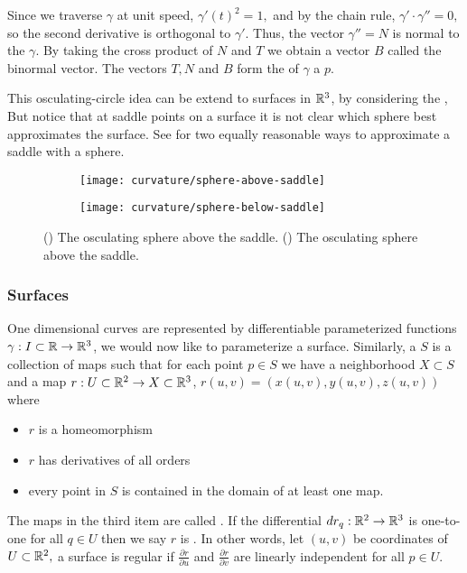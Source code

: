 Since we traverse $\gamma$
at unit speed, $\gamma'(t)^2=1,$ and by the chain rule, $\gamma'\cdot \gamma''=0,$
so  the second derivative is orthogonal to $\gamma'$. Thus, the
vector $\gamma''=N$ is normal to the $\gamma$. 
By taking the cross product of $N$ and $T$ we obtain a vector $B$ called
the binormal vector.
The vectors $T,N$ and $B$ form the  of $\gamma$ a $p.$

 This osculating-circle idea can be extend
to  surfaces in $\mathbb{R}^3$, by considering the ,
But notice that at saddle points on a surface it is not clear which sphere
best approximates the surface. See  for two
equally reasonable ways to approximate a saddle with a sphere.

\begin{figure}[htb]
    \captionsetup[subfigure]{justification=centering}
    \centering
    \begin{subfigure}[b]{0.25\textwidth}
        \texttt{[image: curvature/sphere-above-saddle]}
       \subcaption{}\label{fig:sphere-above-saddle}
    \end{subfigure}
        \hspace{1cm}
        \begin{subfigure}[b]{0.25\textwidth}
        \texttt{[image: curvature/sphere-below-saddle]}
        \subcaption{}\label{fig:sphere-below-saddle}
        \end{subfigure}
    \caption{() The osculating sphere above the saddle.
        () The osculating sphere above the saddle.
    }
    \label{fig:osculating-sphere}
\end{figure}



\subsubsection{Surfaces}


One dimensional curves are represented by differentiable 
parameterized functions $\gamma:I\subset \mathbb{R}\to \mathbb{R}^3$,
we would now like to parameterize a surface.
Similarly, a  $S$ is a collection of maps such that
 for each point $p\in S$ we have a neighborhood $X\subset S$
 and a map $r:U\subset \mathbb{R}^2 \to X\subset \mathbb{R}^3$, $r(u,v)=(x(u,v),y(u,v),z(u,v))$
 where
 \begin{itemize}
 \item  $r$ is a homeomorphism
 \item $r$ has derivatives of all orders
 \item every point in $S$ is contained in the domain of at least one map.

\end{itemize}
The maps in the third item are called .
If the differential $dr_q:\mathbb{R}^2\to \mathbb{R}^3$ is one-to-one for all $q\in U$ then
we say $r$ is . In other words, let $(u,v)$ be coordinates of $U\subset \mathbb{R}^2,$
a surface is regular if $\frac{\partial r}{\partial u}$
and $\frac{\partial r}{\partial v}$ are linearly independent for all $p\in U$.


